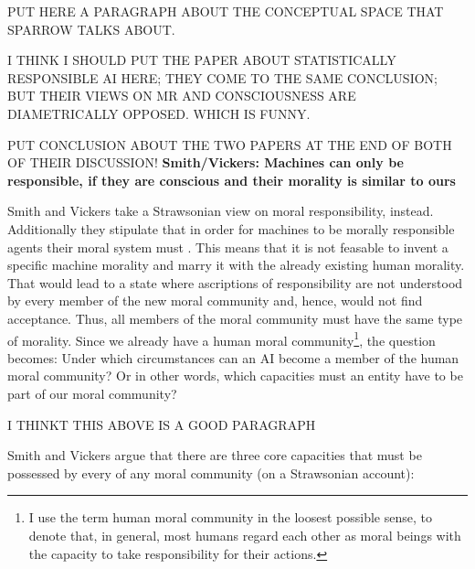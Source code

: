 \documentclass{article}
\begin{document}
PUT HERE A PARAGRAPH ABOUT THE CONCEPTUAL SPACE THAT SPARROW TALKS ABOUT.

I THINK I SHOULD PUT THE PAPER ABOUT STATISTICALLY RESPONSIBLE AI HERE; THEY
COME TO THE SAME CONCLUSION; BUT THEIR VIEWS ON MR AND CONSCIOUSNESS ARE
DIAMETRICALLY OPPOSED. WHICH IS FUNNY.

PUT CONCLUSION ABOUT THE TWO PAPERS AT THE END OF BOTH OF THEIR DISCUSSION!
\newpage
\textbf{Smith/Vickers: Machines can only be responsible, if they are conscious and their
morality is similar to ours}

Smith and Vickers take a Strawsonian view on moral responsibility, instead.
Additionally they stipulate that in order for machines to be morally responsible
agents their moral system must . This means that it is not feasable to invent a specific machine morality
and marry it with the already existing human morality. That would lead to a
state where ascriptions of responsibility are not understood by every member of
the new moral community and, hence, would not find acceptance. Thus, all members
of the moral community must have the same type of morality. Since we already
have a human moral community\footnote{I use the term human moral community in
	the loosest possible sense, to denote that, in general, most humans
	regard each other as moral beings with the capacity to take
responsibility for their actions.}, the question becomes: Under which
circumstances can an AI become a member of the human moral community? Or in
other words, which capacities must an entity have to be part of our moral
community?

I THINKT THIS ABOVE IS A GOOD PARAGRAPH 


%
%
Smith and Vickers argue that there are three core capacities that must be
possessed by every  of any moral community (on a Strawsonian
account):
\end{document}
